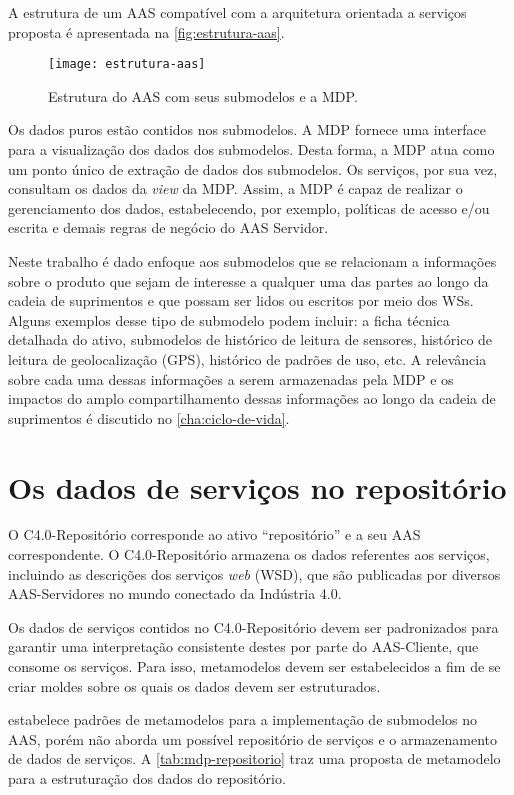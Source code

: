 	A estrutura de um AAS compatível com a arquitetura orientada a serviços proposta é apresentada na \autoref{fig:estrutura-aas}.
	
	\begin{figure}[htb]
		\centering
		\caption{Estrutura do AAS com seus submodelos e a MDP.}
		\label{fig:estrutura-aas}
		\texttt{[image: estrutura-aas]}
	\end{figure}

	Os dados puros estão contidos nos submodelos. A MDP fornece uma interface para a visualização dos dados dos submodelos. Desta forma, a MDP atua como um ponto único de extração de dados dos submodelos. Os serviços, por sua vez, consultam os dados da \textit{view} da MDP. Assim, a MDP é capaz de realizar o gerenciamento dos dados, estabelecendo, por exemplo, políticas de acesso e/ou escrita e demais regras de negócio do AAS Servidor.
	
	Neste trabalho é dado enfoque aos submodelos que se relacionam a informações sobre o produto que sejam de interesse a qualquer uma das partes ao longo da cadeia de suprimentos e que possam ser lidos ou escritos por meio dos WSs. Alguns exemplos desse tipo de submodelo podem incluir: a ficha técnica detalhada do ativo, submodelos de histórico de leitura de sensores, histórico de leitura de geolocalização (GPS), histórico de padrões de uso, etc. A relevância sobre cada uma dessas informações a serem armazenadas pela MDP e os impactos do amplo compartilhamento dessas informações ao longo da cadeia de suprimentos é discutido no \autoref{cha:ciclo-de-vida}.

\section{Os dados de serviços no repositório}
	
	O C4.0-Repositório corresponde ao ativo ``repositório'' e a seu AAS correspondente. O C4.0-Repositório armazena os dados referentes aos serviços, incluindo as descrições dos serviços \textit{web} (WSD), que são publicadas por diversos AAS-Servidores no mundo conectado da Indústria 4.0.
	
	Os dados de serviços contidos no C4.0-Repositório devem ser padronizados para garantir uma interpretação consistente destes por parte do AAS-Cliente, que consome os serviços. Para isso, metamodelos devem ser estabelecidos a fim de se criar moldes sobre os quais os dados devem ser estruturados.
	
	 estabelece padrões de metamodelos para a implementação de submodelos no AAS, porém não aborda um possível repositório de serviços e o armazenamento de dados de serviços. A \autoref{tab:mdp-repositorio} traz uma proposta de metamodelo para a estruturação dos dados do repositório.
	
